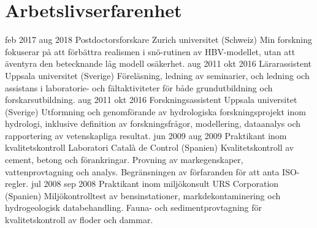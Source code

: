 \ifswedish
    \section{Arbetslivserfarenhet}
        \position
            {feb 2017 \textemdash{} aug 2018}
            {Postdoctorsforskare}
            {Zurich universitet (Schweiz)}
            {Min forskning fokuserar på att förbättra realismen i snö-rutinen av HBV-modellet, utan att äventyra den betecknande låg modell osäkerhet.}
        \position
            {aug 2011 \textemdash{} okt 2016}
            {Lärarassistent}
            {Uppsala universitet (Sverige)}
            {Föreläsning, ledning av seminarier, och ledning och assistans i laboratorie- och fältaktiviteter för både grundutbildning och forskarsutbildning.}
        \position
            {aug 2011 \textemdash{} okt 2016}
            {Forskningsassistent}
            {Uppsala universitet (Sverige)}
            {Utformning och genomförande av hydrologiska forskningsprojekt inom hydrologi, inklusive definition av forskningsfrågor, modellering, dataanalys och rapportering av vetenskapliga resultat.}
        \position
            {jun 2009 \textemdash{} aug 2009}
            {Praktikant inom kvalitetskontroll}
            {Laboratori Català de Control (Spanien)}
            {Kvalitetskontroll av cement, betong och förankringar. Provning av markegenskaper, vattenprovtagning och analys. Begränsningen av förfaranden för att anta ISO-regler.}
        \position
            {jul 2008 \textemdash{} sep 2008}
            {Praktikant inom miljökonsult}
            {URS Corporation (Spanien)}
            {Miljökontrolltest av bensinstationer, markdekontaminering och hydrogeologisk databehandling. Fauna- och sedimentprovtagning för kvalitetskontroll av floder och dammar.}
\else
